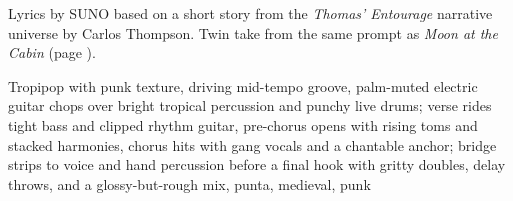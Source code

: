 
\label{sec:at-the-cabin}
\begin{notes}
Lyrics by SUNO based on a short story from the \emph{Thomas’ Entourage} narrative universe by Carlos Thompson. Twin take from the same prompt as \emph{Moon at the Cabin} (page \pageref{sec:moon-at-the-cabin}).
\end{notes}
\begin{style}
Tropipop with punk texture, driving mid-tempo groove, palm-muted electric guitar chops over bright tropical percussion and punchy live drums; verse rides tight bass and clipped rhythm guitar, pre-chorus opens with rising toms and stacked harmonies, chorus hits with gang vocals and a chantable anchor; bridge strips to voice and hand percussion before a final hook with gritty doubles, delay throws, and a glossy-but-rough mix, punta, medieval, punk
\end{style}
